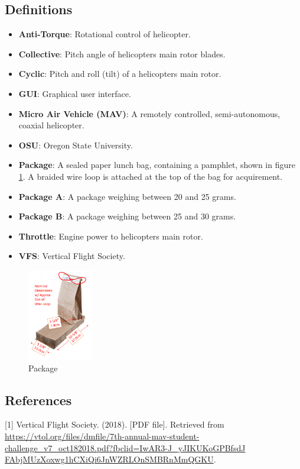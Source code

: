 \documentclass[onecolumn, oneside, letterpaper, draftclsnofoot, 10pt, compsoc]{IEEEtran}
\begin{document}
\subsection{Definitions}
\begin{itemize}
    \item \textbf{Anti-Torque}: Rotational control of helicopter.
    \item \textbf{Collective}: Pitch angle of helicopter\textquotesingle s main rotor blades.
    \item \textbf{Cyclic}: Pitch and roll (tilt) of a helicopter\textquotesingle s main rotor.
    \item \textbf{GUI}: Graphical user interface.
    \item \textbf{Micro Air Vehicle (MAV)}: A remotely controlled, semi-autonomous, coaxial helicopter.
    \item \textbf{OSU}: Oregon State University.
    \item \textbf{Package}: A sealed paper lunch bag, containing a pamphlet, shown in figure \ref{fig:Bag}. A braided wire loop is attached at the top of the bag for acquirement.
    \item \textbf{Package A}: A package weighing between 20 and 25 grams.
    \item \textbf{Package B}: A package weighing between 25 and 30 grams.
    \item \textbf{Throttle}: Engine power to helicopter\textquotesingle s main rotor.
    \item \textbf{VFS}: Vertical Flight Society.
\end{itemize}
\begin{figure}[h]
    \centering
    \includegraphics[height=4cm]{graphics/bag.png}
    \caption{Package}
    \label{fig:Bag}
\end{figure}

\subsection{References}
[1]
\newblock Vertical Flight Society. (2018).
 [PDF file].
\newblock Retrieved from \url{https://vtol.org/files/dmfile/7th-annual-mav-student-challenge_v7_oct182018.pdf?fbclid=IwAR3-J_yJIKUKoGPBfsdJ}\\ \url{FAbjMUzXoxwg1hCXiQi6JnWZRLOnSMBRnMmQGKU}.
\end{document}
